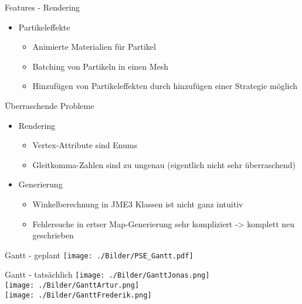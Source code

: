 \documentclass[10pt]{beamer}
\begin{document}
\begin{frame}{Features - Rendering}
\begin{itemize}
    \item Partikeleffekte
    \begin{itemize}
        \item Animierte Materialien für Partikel
        \item Batching von Partikeln in einen Mesh
        \item Hinzufügen von Partikeleffekten durch hinzufügen einer Strategie möglich
    \end{itemize}
\end{itemize}
\end{frame}

\begin{frame}{Überraschende Probleme}
\begin{itemize}
    \item Rendering
    \begin{itemize}
        \item Vertex-Attribute sind Enums
        \item Gleitkomma-Zahlen sind zu ungenau (eigentlich nicht sehr überraschend)
    \end{itemize}

    \item Generierung
    \begin{itemize}
        \item Winkelberechnung in JME3 Klassen ist nicht ganz intuitiv
        \item Fehlersuche in ertser Map-Generierung sehr kompliziert -> komplett neu geschrieben
    \end{itemize}
\end{itemize}
\end{frame}

\begin{frame}{Gantt - geplant}
    \texttt{[image: ./Bilder/PSE\_Gantt.pdf]}
\end{frame}

\begin{frame}{Gantt - tatsächlich}
    \texttt{[image: ./Bilder/GanttJonas.png]}\\
    \texttt{[image: ./Bilder/GanttArtur.png]}\\
    \texttt{[image: ./Bilder/GanttFrederik.png]}
\end{frame}
\end{document}
